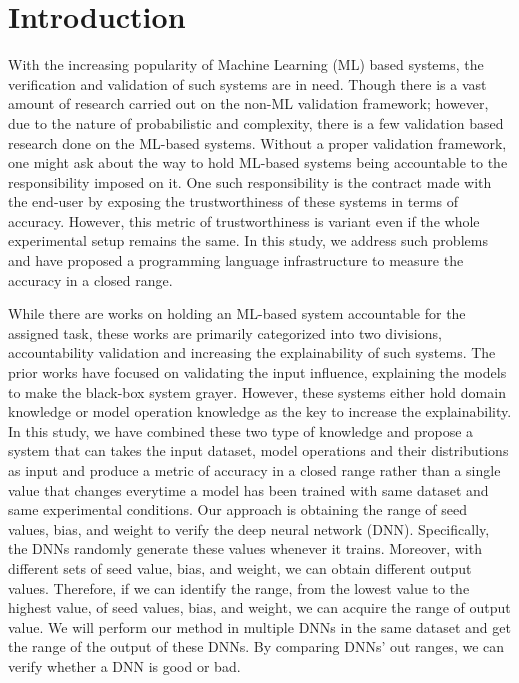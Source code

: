 
\section{Introduction}
With the increasing popularity of Machine Learning (ML) based systems, the verification and validation of such systems are in need. Though there is a vast amount of research carried out on the non-ML validation framework; however, due to the nature of probabilistic and complexity, there is a few validation based research done on the ML-based systems. Without a proper validation framework, one might ask about the way to hold ML-based systems being accountable to the responsibility imposed on it. One such responsibility is the contract made with the end-user by exposing the trustworthiness of these systems in terms of accuracy. However, this metric of trustworthiness is variant even if the whole experimental setup remains the same. In this study, we address such problems and have proposed a programming language infrastructure to measure the accuracy in a closed range.

While there are works on holding an ML-based system accountable for the assigned task, these works are primarily categorized into two divisions, accountability validation and increasing the explainability of such systems. The prior works have focused on validating the input influence, explaining the models to make the black-box system grayer. However, these systems either hold domain knowledge or model operation knowledge as the key to increase the explainability. In this study, we have combined these two type of knowledge and propose a system that can takes the input dataset, model operations and their distributions as input and produce a metric of accuracy in a closed range rather than a single value that changes everytime a model has been trained with same dataset and same experimental conditions. Our approach is obtaining the range of seed values, bias, and weight to verify the deep neural network (DNN). Specifically, the DNNs randomly generate these values whenever it trains. Moreover, with different sets of seed value, bias, and weight, we can obtain different output values. Therefore, if we can identify the range, from the lowest value to the highest value, of seed values, bias, and weight, we can acquire the range of output value. We will perform our method in multiple DNNs in the same dataset and get the range of the output of these DNNs. By comparing DNNs' out ranges, we can verify whether a DNN is good or bad.

